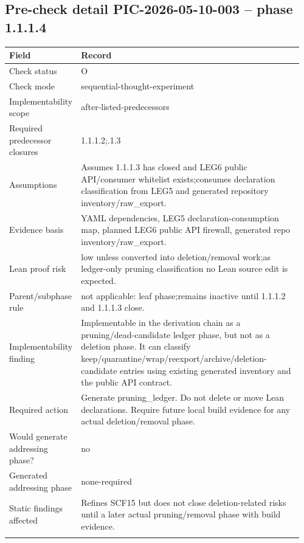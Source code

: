\subsection*{Pre-check detail PIC-2026-05-10-003 -- phase 1.1.1.4}
\begin{longtable}{L{0.18\linewidth} L{0.78\linewidth}}
\hline
\textbf{Field} & \textbf{Record}\\
\hline
Check status & O\\
\hline\addlinespace[0.20em]
Check mode & sequential-thought-experiment\\
\hline\addlinespace[0.20em]
Implementability scope & after-listed-predecessors\\
\hline\addlinespace[0.20em]
Required predecessor closures & 1.1.1.2;.1.3\\
\hline\addlinespace[0.20em]
Assumptions & Assumes 1.1.1.3 has closed and LEG6 public API/\allowbreak{}consumer whitelist exists;\newline consumes declaration classification from LEG5 and generated repository inventory/\allowbreak{}raw\_export.\\
\hline\addlinespace[0.20em]
Evidence basis & YAML dependencies, LEG5 declaration-consumption map, planned LEG6 public API firewall, generated repo inventory/\allowbreak{}raw\_export.\\
\hline\addlinespace[0.20em]
Lean proof risk & low unless converted into deletion/\allowbreak{}removal work;\newline as ledger-only pruning classification no Lean source edit is expected.\\
\hline\addlinespace[0.20em]
Parent/\allowbreak{}subphase rule & not applicable: leaf phase;\newline remains inactive until 1.1.1.2 and 1.1.1.3 close.\\
\hline\addlinespace[0.20em]
Implementability finding & Implementable in the derivation chain as a pruning/\allowbreak{}dead-candidate ledger phase, but not as a deletion phase. It can classify keep/\allowbreak{}quarantine/\allowbreak{}wrap/\allowbreak{}reexport/\allowbreak{}archive/\allowbreak{}deletion-candidate entries using existing generated inventory and the public API contract.\\
\hline\addlinespace[0.20em]
Required action & Generate pruning\_ledger. Do not delete or move Lean declarations. Require future local build evidence for any actual deletion/\allowbreak{}removal phase.\\
\hline\addlinespace[0.20em]
Would generate addressing phase? & no\\
\hline\addlinespace[0.20em]
Generated addressing phase & none-required\\
\hline\addlinespace[0.20em]
Static findings affected & Refines SCF15 but does not close deletion-related risks until a later actual pruning/\allowbreak{}removal phase with build evidence.\\
\hline\addlinespace[0.20em]
\end{longtable}
